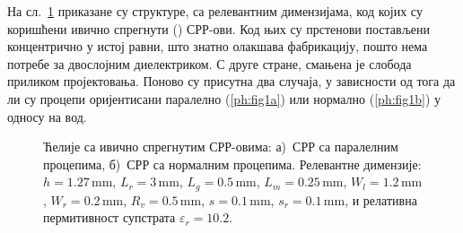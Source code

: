 \newcommand{\labelaslike}{а)~СРР са паралелним процепима, б)~СРР са нормалним процепима. }
На сл.~\ref{ph:fig1} приказане су структуре, са релевантним димензијама, код којих су коришћени ивично спрегнути () СРР-ови. Код њих су прстенови постављени концентрично у истој равни, што знатно олакшава фабрикацију, пошто нема потребе за двослојним диелектриком. С друге стране, смањена је слобода приликом пројектовања. Поново су присутна два случаја, у зависности од тога да ли су процепи оријентисани паралелно (\ref{ph:fig1a}) или нормално (\ref{ph:fig1b}) у односу на вод.
\begin{figure}[!t]
\centering
{}
\hfill
{}
\caption{Ћелије са ивично спрегнутим СРР-овима: \labelaslike Релевантне димензије: $h=\num{1.27}\,\mathrm{mm}$, $L_r=3\,\mathrm{mm}$, $L_g=\num{0.5}\,\mathrm{mm}$, $L_m=\num{0.25}\,\mathrm{mm}$, $W_l=\num{1.2}\,\mathrm{mm}$, $W_r=\num{0.2}\,\mathrm{mm}$, $R_v=\num{0.5}\,\mathrm{mm}$, $s=\num{0.1}\,\mathrm{mm}$, $s_r=\num{0.1}\,\mathrm{mm}$, и релативна пермитивност супстрата $\varepsilon_r=\num{10.2}$.}
\label{ph:fig1}
\end{figure} 

